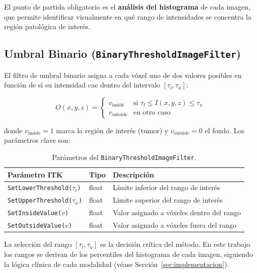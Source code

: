 \documentclass[12pt, a4paper]{article}
\begin{document}
El punto de partida obligatorio es el \textbf{análisis del histograma} de cada imagen, que
permite identificar visualmente en qué rango de intensidades se concentra la región
patológica de interés.

\subsection{Umbral Binario (\texttt{BinaryThresholdImageFilter})}

El filtro de umbral binario asigna a cada vóxel uno de dos valores posibles en función de
si su intensidad cae dentro del intervalo $[\tau_l, \tau_u]$:

\begin{equation}
  O(x,y,z) =
  \begin{cases}
    v_{\text{inside}}  & \text{si } \tau_l \leq I(x,y,z) \leq \tau_u \\
    v_{\text{outside}} & \text{en otro caso}
  \end{cases}
  \label{eq:binary}
\end{equation}

donde $v_{\text{inside}} = 1$ marca la región de interés (tumor) y $v_{\text{outside}} = 0$
el fondo. Los parámetros clave son:

\begin{table}[H]
\centering
\renewcommand{\arraystretch}{1.3}
\begin{tabular}{llp{7cm}}
\toprule
\textbf{Parámetro ITK} & \textbf{Tipo} & \textbf{Descripción} \\
\midrule
\texttt{SetLowerThreshold($\tau_l$)} & float & Límite inferior del rango de interés \\
\texttt{SetUpperThreshold($\tau_u$)} & float & Límite superior del rango de interés \\
\texttt{SetInsideValue($v$)}         & float & Valor asignado a vóxeles dentro del rango \\
\texttt{SetOutsideValue($v$)}        & float & Valor asignado a vóxeles fuera del rango \\
\bottomrule
\end{tabular}
\caption{Parámetros del \texttt{BinaryThresholdImageFilter}.}
\label{tab:binary_params}
\end{table}

La selección del rango $[\tau_l, \tau_u]$ es la decisión crítica del método. En este
trabajo los rangos se derivan de los percentiles del histograma de cada imagen, siguiendo
la lógica clínica de cada modalidad (véase Sección~\ref{sec:implementacion}).
\end{document}
